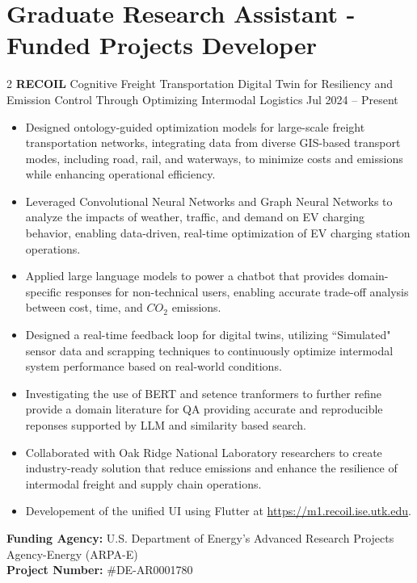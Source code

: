 \documentclass[10pt, letterpaper]{article}
\newenvironment{highlights}{
    \begin{itemize}[
        topsep=0.10 cm,
        parsep=0.10 cm,
        partopsep=0pt,
        itemsep=0pt,
        leftmargin=0 cm + 10pt
    ]
}{
    \end{itemize}
} %
\newenvironment{twocolentry}[2][]{
    \onecolentry
    \def\secondColumn{#2}
    \setcolumnwidth{\fill, 4.5 cm}
    \begin{paracol}{2}
}{
    \switchcolumn \raggedleft \secondColumn
    \end{paracol}
    \endonecolentry
} %
\begin{document}
    \section*{Graduate Research Assistant - Funded Projects Developer}
    \small
    \begin{twocolentry}{Jul 2024 – Present} \textbf{RECOIL} \textbar Cognitive Freight Transportation Digital Twin for Resiliency and Emission Control Through Optimizing Intermodal Logistics \end{twocolentry} \begin{highlights} 
        \item Designed ontology-guided optimization models for large-scale freight transportation networks, integrating data from diverse GIS-based transport modes, including road, rail, and waterways, to minimize costs and emissions while enhancing operational efficiency. 
        \item Leveraged Convolutional Neural Networks and Graph Neural Networks to analyze the impacts of weather, traffic, and demand on EV charging behavior, enabling data-driven, real-time optimization of EV charging station operations. 
        \item Applied large language models to power a chatbot that provides domain-specific responses for non-technical users, enabling accurate trade-off analysis between cost, time, and $CO_2$ emissions.
        \item Designed a real-time feedback loop for digital twins, utilizing ``Simulated" sensor data and scrapping techniques to continuously optimize intermodal system performance based on real-world conditions.
        \item Investigating the use of BERT and setence tranformers to further refine provide a domain literature for QA providing accurate and reproducible reponses supported by LLM and similarity based search.
        \item Collaborated with Oak Ridge National Laboratory researchers to create industry-ready solution that reduce emissions and enhance the resilience of intermodal freight and supply chain operations.
        \item Developement of the unified UI using Flutter at \url{https://m1.recoil.ise.utk.edu}.
        
        \end{highlights} \vspace{0.3cm} \noindent \textbf{Funding Agency:} U.S. Department of Energy’s Advanced Research Projects Agency-Energy (ARPA-E)\\  \textbf{Project Number:} \#DE-AR0001780
\end{document}

